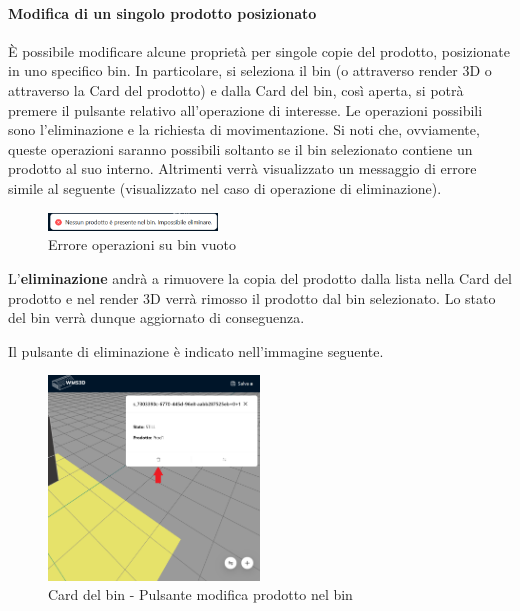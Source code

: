         \paragraph{Modifica di un singolo prodotto posizionato}
        È possibile modificare alcune proprietà per singole copie del prodotto, posizionate in uno specifico bin. In particolare, si seleziona il bin (o attraverso render 3D o attraverso la Card del prodotto) e dalla Card del bin, così aperta, si potrà premere il pulsante relativo all'operazione di interesse. Le operazioni possibili sono l'eliminazione e la richiesta di movimentazione. Si noti che, ovviamente, queste operazioni saranno possibili soltanto se il bin selezionato contiene un prodotto al suo interno. Altrimenti verrà visualizzato un messaggio di errore simile al seguente (visualizzato nel caso di operazione di eliminazione).
        \begin{figure}[H]
            \centering
            \includegraphics[width=0.4\textwidth]{images/errore_bin_vuoto.png}
            \caption{Errore operazioni su bin vuoto}
        \end{figure}
        
        
        \bigskip
        \noindent L'\textbf{eliminazione} andrà a rimuovere la copia del prodotto dalla lista nella Card del prodotto e nel render 3D verrà rimosso il prodotto dal bin selezionato. Lo stato del bin verrà dunque aggiornato di conseguenza.
        
        \noindent Il pulsante di eliminazione è indicato nell'immagine seguente.
        \begin{figure}[H]
            \centering
            \includegraphics[width=0.5\textwidth]{images/pulsante_elimina_prod_bin.png}
            \caption{Card del bin - Pulsante modifica prodotto nel bin}
        \end{figure}
        
